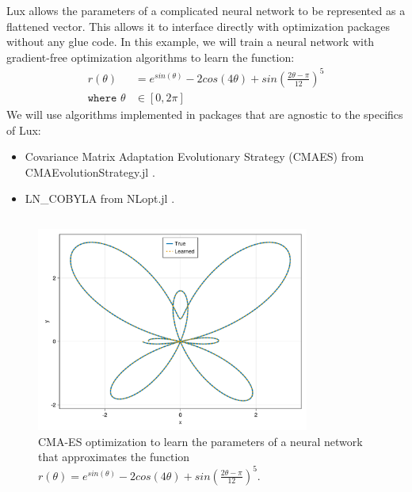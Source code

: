 Lux allows the parameters of a complicated neural network to be represented as a flattened vector. This allows it to interface directly with optimization packages without any glue code. In this example, we will train a neural network with gradient-free optimization algorithms to learn the function:
%
\begin{align}
  r(\theta) &= e^{sin(\theta)} - 2cos(4\theta) + sin\left(\frac{2\theta - \pi}{12}\right)^5\\
  \texttt{where } \theta &\in [0, 2\pi]
\end{align}
%
We will use algorithms implemented in packages that are agnostic to the specifics of Lux:
%
\begin{itemize}
  \item Covariance Matrix Adaptation Evolutionary Strategy (CMAES) \tocite from CMAEvolutionStrategy.jl \tocite.
  \item LN\_COBYLA \tocite from NLopt.jl \tocite {}.
\end{itemize}
%


\inputminted[linenos, breaklines, fontsize=\scriptsize]{julia}{../code/gfopt.jl}

\begin{figure}[t]
  \centering
  \includegraphics[width=0.8\textwidth]{../figures/lux/cmaes_plot.pdf}
  \caption{CMA-ES optimization to learn the parameters of a neural network that approximates the function $r(\theta) = e^{sin(\theta)} - 2cos(4\theta) + sin\left(\frac{2\theta - \pi}{12}\right)^5$.}
  \label{fig:lux_cmaes_plot}
\end{figure}

